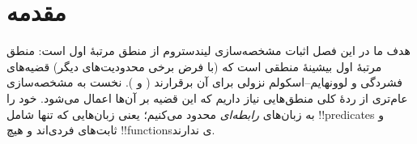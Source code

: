 \documentclass[../../../include/open-logic-section]{subfiles}
\begin{document}
\section{مقدمه}

هدف ما در این فصل اثبات مشخصه‌سازی لیندستروم از منطق مرتبهٔ اول است:
منطق مرتبهٔ اول بیشینهٔ منطقی است که (با فرض برخی محدودیت‌های دیگر)
قضیه‌های فشردگی و لوونهایم--اسکولم نزولی برای آن برقرارند
( و
). نخست به مشخصه‌سازی عام‌تری از
ردهٔ کلی منطق‌هایی نیاز داریم که این قضیه بر آن‌ها اعمال می‌شود. خود
را به زبان‌های
\emph{رابطه‌ای} محدود می‌کنیم؛ یعنی زبان‌هایی که تنها شامل
!!{predicate}s و ثابت‌های فردی‌اند و هیچ !!{function}sی ندارند.
\end{document}
